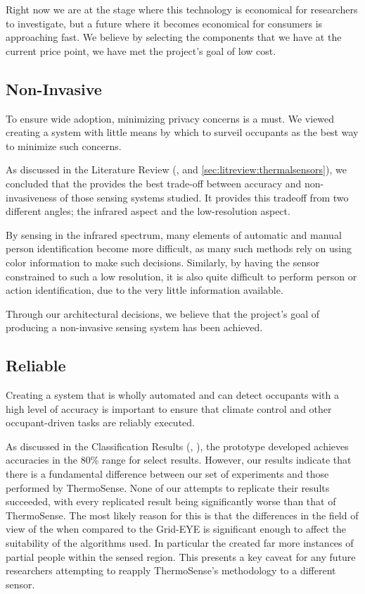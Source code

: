 \documentclass[../thesis/thesis.tex]{subfiles}
\begin{document}
Right now we are at the stage where this technology is economical for researchers to investigate, but a future where it becomes economical for consumers is approaching fast. We believe by selecting the components that we have at the current price point, we have met the project's goal of low cost.

\subsection{Non-Invasive}
To ensure wide adoption, minimizing privacy concerns is a must. We viewed creating a system with little means by which to  surveil occupants as the best way to minimize such concerns.

As discussed in the Literature Review (,  and \ref{sec:litreview:thermalsensors}), we concluded that the \mlx provides the best trade-off between accuracy and non-invasiveness of those sensing systems studied. It provides this tradeoff from two different angles; the infrared aspect and the low-resolution aspect. 

By sensing in the infrared spectrum, many elements of automatic and manual person identification become more difficult, as many such methods rely on using color information to make such decisions. Similarly, by having the sensor constrained to such a low resolution, it is also quite difficult to perform person or action identification, due to the very little information available.

Through our architectural decisions, we believe that the project's goal of producing a non-invasive sensing system has been achieved.

\subsection{Reliable}
Creating a system that is wholly automated and can detect occupants with a high level of accuracy is important to ensure that climate control and other occupant-driven tasks are reliably executed.

As discussed in the Classification Results (, ), the prototype developed achieves accuracies in the 80\% range for select results. However, our results indicate that there is a fundamental difference between our set of experiments and those performed by ThermoSense. None of our attempts to replicate their results succeeded, with every replicated result being significantly worse than that of ThermoSense. The most likely reason for this is that the differences in the field of view of the \mlx when compared to the Grid-EYE is significant enough to affect the suitability of the algorithms used. In particular the \mlx created far more instances of partial people within the sensed region. This presents a key caveat for any future researchers attempting to reapply ThermoSense's methodology to a different sensor.
\end{document}
